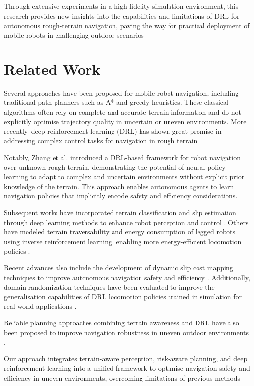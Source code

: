 \documentclass[conference]{IEEEtran}
\begin{document}
Through extensive experiments in a high-fidelity simulation environment, this research provides new insights into the capabilities and limitations of DRL for autonomous rough-terrain navigation, paving the way for practical deployment of mobile robots in challenging outdoor scenarios

\section{Related Work}

Several approaches have been proposed for mobile robot navigation, including traditional path planners such as A* and greedy heuristics. These classical algorithms often rely on complete and accurate terrain information and do not explicitly optimise trajectory quality in uncertain or uneven environments. More recently, deep reinforcement learning (DRL) has shown great promise in addressing complex control tasks for navigation in rough terrain.

Notably, Zhang et al. \cite{Zhang2018DRL} introduced a DRL-based framework for robot navigation over unknown rough terrain, demonstrating the potential of neural policy learning to adapt to complex and uncertain environments without explicit prior knowledge of the terrain. This approach enables autonomous agents to learn navigation policies that implicitly encode safety and efficiency considerations.

Subsequent works have incorporated terrain classification and slip estimation through deep learning methods to enhance robot perception and control \cite{gonzalez2018deepterramechanics}. Others have modeled terrain traversability and energy consumption of legged robots using inverse reinforcement learning, enabling more energy-efficient locomotion policies \cite{gan2022energy}.

Recent advances also include the development of dynamic slip cost mapping techniques to improve autonomous navigation safety and efficiency \cite{slipnet2024}. Additionally, domain randomization techniques have been evaluated to improve the generalization capabilities of DRL locomotion policies trained in simulation for real-world applications \cite{mdpi2022randomization}.

Reliable planning approaches combining terrain awareness and DRL have also been proposed to improve navigation robustness in uneven outdoor environments \cite{weerakoon2022terp}.

Our approach integrates terrain-aware perception, risk-aware planning, and deep reinforcement learning into a unified framework to optimise navigation safety and efficiency in uneven environments, overcoming limitations of previous methods
\end{document}
